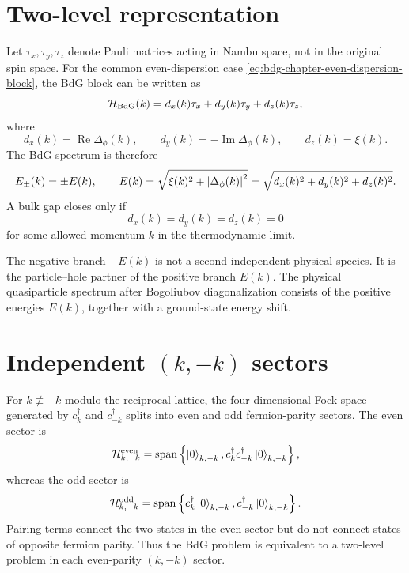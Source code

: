 \section{Two-level representation}

Let $\tau_x,\tau_y,\tau_z$ denote Pauli matrices acting in Nambu space, not in the
original spin space.  For the common even-dispersion case
\cref{eq:bdg-chapter-even-dispersion-block}, the BdG block can be written as
\begin{equation}
\label{eq:bdg-chapter-d-vector-form}
    \mathcal{H}_{\rm BdG}(k)
    =
    d_x(k)\tau_x+d_y(k)\tau_y+d_z(k)\tau_z,
\end{equation}
where
\begin{equation}
\label{eq:bdg-chapter-d-vector-components}
    d_x(k)=\operatorname{Re}\Delta_\phi(k),
    \qquad
    d_y(k)=-\operatorname{Im}\Delta_\phi(k),
    \qquad
    d_z(k)=\xi(k).
\end{equation}
The BdG spectrum is therefore
\begin{equation}
\label{eq:bdg-chapter-spectrum}
    E_\pm(k)
    =
    \pm E(k),
    \qquad
    E(k)=\sqrt{\xi(k)^2+\left|\Delta_\phi(k)\right|^2}
    =\sqrt{d_x(k)^2+d_y(k)^2+d_z(k)^2}.
\end{equation}
A bulk gap closes only if
\begin{equation}
\label{eq:bdg-chapter-gap-closing-condition}
    d_x(k)=d_y(k)=d_z(k)=0
\end{equation}
for some allowed momentum $k$ in the thermodynamic limit.

\begin{remark}
The negative branch $-E(k)$ is not a second independent physical species.  It is
the particle--hole partner of the positive branch $E(k)$.  The physical
quasiparticle spectrum after Bogoliubov diagonalization consists of the positive
energies $E(k)$, together with a ground-state energy shift.
\end{remark}

\section[Independent (k,-k) sectors]{Independent $(k,-k)$ sectors}

For $k\not\equiv -k$ modulo the reciprocal lattice, the four-dimensional Fock
space generated by $c_k^\dagger$ and $c_{-k}^\dagger$ splits into even and odd
fermion-parity sectors.  The even sector is
\begin{equation}
\label{eq:bdg-chapter-even-sector-basis}
    \mathcal{H}_{k,-k}^{\rm even}
    =
    \operatorname{span}\left\{
        \left|0\right\rangle_{k,-k},
        c_k^\dagger c_{-k}^\dagger\left|0\right\rangle_{k,-k}
    \right\},
\end{equation}
whereas the odd sector is
\begin{equation}
    \mathcal{H}_{k,-k}^{\rm odd}
    =
    \operatorname{span}\left\{
        c_k^\dagger\left|0\right\rangle_{k,-k},
        c_{-k}^\dagger\left|0\right\rangle_{k,-k}
    \right\}.
\end{equation}
Pairing terms connect the two states in the even sector but do not connect states
of opposite fermion parity.  Thus the BdG problem is equivalent to a two-level
problem in each even-parity $(k,-k)$ sector.

